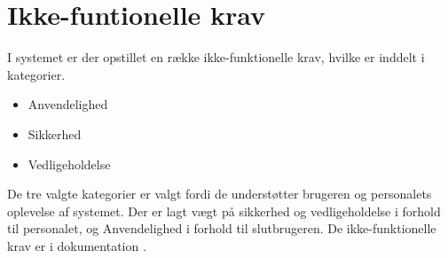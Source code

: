 \section{Ikke-funtionelle krav}

I systemet er der opstillet en række ikke-funktionelle krav, hvilke er inddelt i kategorier.

\begin{itemize}
  \item Anvendelighed
  \item Sikkerhed
  \item Vedligeholdelse
\end{itemize}

De tre valgte kategorier er valgt fordi de understøtter brugeren og personalets oplevelse af systemet. Der er lagt vægt på sikkerhed og vedligeholdelse i forhold til personalet, og Anvendelighed i forhold til slutbrugeren. De ikke-funktionelle krav er i dokumentation \cite[Ikke-funktionelle krav]{documentation-kravspec}.